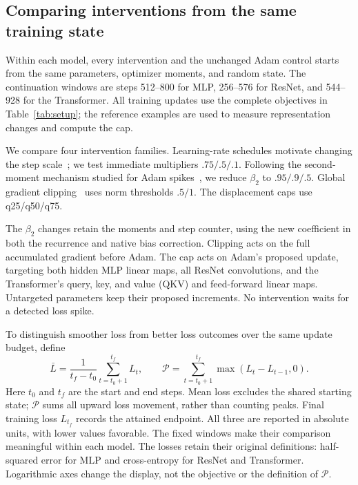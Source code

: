 \subsection{Comparing interventions from the same training state}
Within each model, every intervention and the unchanged Adam control
starts from the same parameters, optimizer moments, and random state.
The continuation windows are steps 512--800 for MLP, 256--576 for
ResNet, and 544--928 for the Transformer. All training updates use the
complete objectives in Table~\ref{tab:setup}; the reference examples are
used to measure representation changes and compute the cap.



We compare four intervention families. Learning-rate schedules motivate
changing the step scale~\cite{smith2017cyclical,loshchilov2016sgdr};
we test immediate multipliers $.75/.5/.1$. Following the second-moment
mechanism studied for Adam spikes~\cite{bai2026spikes}, we reduce
$\beta_2$ to $.95/.9/.5$. Global gradient clipping~\cite{pascanu2013difficulty}
uses norm thresholds $.5/1$. The displacement caps use q25/q50/q75.

The $\beta_2$ changes retain the moments and step counter, using the
new coefficient in both the recurrence and native bias correction.
Clipping acts on the full accumulated gradient before Adam. The cap
acts on Adam's proposed update, targeting both hidden MLP linear maps,
all ResNet convolutions, and the Transformer's query, key, and value
(QKV) and feed-forward linear maps. Untargeted parameters keep their
proposed increments. No intervention waits for a detected loss spike.

To distinguish smoother loss from better loss outcomes over the same
update budget, define
\begin{equation}
 \bar L=\frac{1}{t_f-t_0}\sum_{t=t_0+1}^{t_f}L_t,\qquad
 \mathcal P=\sum_{t=t_0+1}^{t_f}\max(L_t-L_{t-1},0).
 \label{eq:vc-outcomes}
\end{equation}
Here $t_0$ and $t_f$ are the start and end steps. Mean loss excludes the
shared starting state; $\mathcal P$ sums all upward loss movement,
rather than counting peaks. Final training loss $L_{t_f}$ records the
attained endpoint. All three are reported in absolute units, with lower
values favorable. The fixed windows make their comparison meaningful
within each model. The losses retain their original definitions: half-squared
error for MLP and cross-entropy for ResNet and Transformer. Logarithmic
axes change the display, not the objective or the definition of $\mathcal P$.

